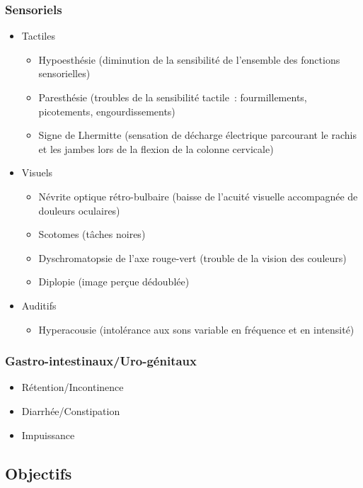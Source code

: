 \documentclass[a4paper,12pt,francais]{article}
\begin{document}
\subsubsection{Sensoriels}
\begin{itemize}
    \item Tactiles
        \begin{itemize}
            \item Hypoesthésie (diminution de la sensibilité de l'ensemble des fonctions sensorielles)
            \item Paresthésie (troubles de la sensibilité tactile~: fourmillements, picotements, engourdissements)
            \item Signe de Lhermitte (sensation de décharge électrique parcourant le rachis et les jambes lors de la flexion de la colonne cervicale)
        \end{itemize}
    \item Visuels
        \begin{itemize}
            \item Névrite optique rétro-bulbaire (baisse de l'acuité visuelle accompagnée de douleurs oculaires)
            \item Scotomes (tâches noires)
            \item Dyschromatopsie de l'axe rouge-vert (trouble de la vision des couleurs)
            \item Diplopie (image perçue dédoublée)
        \end{itemize}
    \item Auditifs
        \begin{itemize}
            \item Hyperacousie (intolérance aux sons variable en fréquence et en intensité)
        \end{itemize}
\end{itemize}
\subsubsection{Gastro-intestinaux/Uro-génitaux}
\begin{itemize}
    \item Rétention/Incontinence
    \item Diarrhée/Constipation
    \item Impuissance
\end{itemize}
\subsection{Objectifs} %
\end{document}
